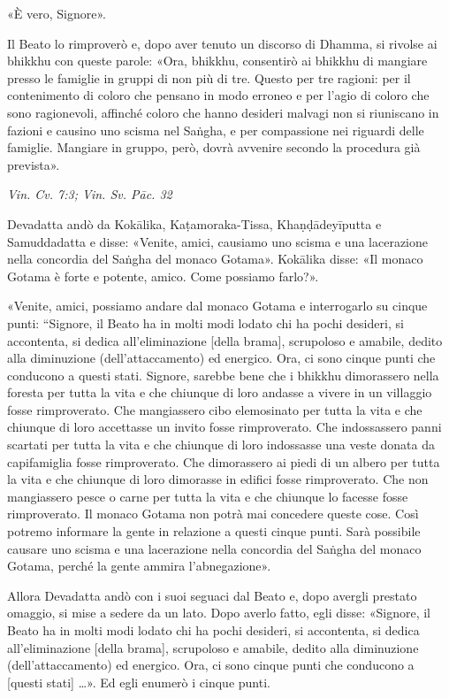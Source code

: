 «È vero, Signore».


Il Beato lo rimproverò e, dopo aver tenuto un discorso di Dhamma, si
rivolse ai bhikkhu con queste parole: «Ora, bhikkhu, consentirò ai
bhikkhu di mangiare presso le famiglie in gruppi di non più di tre.
Questo per tre ragioni: per il contenimento di coloro che pensano in
modo erroneo e per l’agio di coloro che sono ragionevoli, affinché
coloro che hanno desideri malvagi non si riuniscano in fazioni e causino
uno scisma nel Saṅgha, e per compassione nei riguardi delle famiglie.
Mangiare in gruppo, però, dovrà avvenire secondo la procedura già
prevista».


\emph{Vin. Cv. 7:3; Vin. Sv. Pāc. 32}


Devadatta andò da Kokālika, Kaṭamoraka-Tissa, Khaṇḍādeyīputta e
Samuddadatta e disse: «Venite, amici, causiamo uno scisma e una
lacerazione nella concordia del Saṅgha del monaco Gotama». Kokālika
disse: «Il monaco Gotama è forte e potente, amico. Come possiamo
farlo?».


«Venite, amici, possiamo andare dal monaco Gotama e interrogarlo su
cinque punti: “Signore, il Beato ha in molti modi lodato chi ha pochi
desideri, si accontenta, si dedica all’eliminazione [della brama],
scrupoloso e amabile, dedito alla diminuzione (dell’attaccamento) ed
energico. Ora, ci sono cinque punti che conducono a questi stati.
Signore, sarebbe bene che i bhikkhu dimorassero nella foresta per tutta
la vita e che chiunque di loro andasse a vivere in un villaggio fosse
rimproverato. Che mangiassero cibo elemosinato per tutta la vita e che
chiunque di loro accettasse un invito fosse rimproverato. Che
indossassero panni scartati per tutta la vita e che chiunque di loro
indossasse una veste donata da capifamiglia fosse rimproverato. Che
dimorassero ai piedi di un albero per tutta la vita e che chiunque di
loro dimorasse in edifici fosse rimproverato. Che non mangiassero pesce
o carne per tutta la vita e che chiunque lo facesse fosse rimproverato.
Il monaco Gotama non potrà mai concedere queste cose. Così potremo
informare la gente in relazione a questi cinque punti. Sarà possibile
causare uno scisma e una lacerazione nella concordia del Saṅgha del
monaco Gotama, perché la gente ammira l’abnegazione».


Allora Devadatta andò con i suoi seguaci dal Beato e, dopo avergli
prestato omaggio, si mise a sedere da un lato. Dopo averlo fatto, egli
disse: «Signore, il Beato ha in molti modi lodato chi ha pochi desideri,
si accontenta, si dedica all’eliminazione [della brama], scrupoloso e
amabile, dedito alla diminuzione (dell’attaccamento) ed energico. Ora,
ci sono cinque punti che conducono a [questi stati] …​». Ed egli
enumerò i cinque punti.


